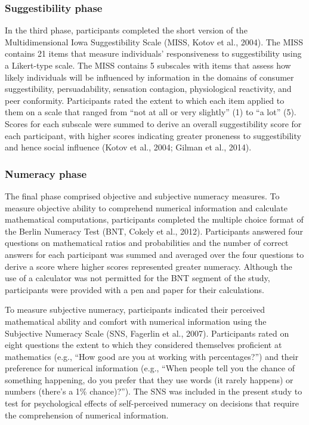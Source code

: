 \documentclass[
  pub,floatsintext]{apa6}
\begin{document}
\hypertarget{suggestibility-phase}{%
\subsubsection{Suggestibility phase}\label{suggestibility-phase}}

In the third phase, participants completed the short version of the Multidimensional Iowa Suggestibility Scale (MISS, Kotov et al., 2004). The MISS contains 21 items that measure individuals' responsiveness to suggestibility using a Likert-type scale. The MISS contains 5 subscales with items that assess how likely individuals will be influenced by information in the domains of consumer suggestibility, persuadability, sensation contagion, physiological reactivity, and peer conformity. Participants rated the extent to which each item applied to them on a scale that ranged from ``not at all or very slightly'' (1) to ``a lot'' (5). Scores for each subscale were summed to derive an overall suggestibility score for each participant, with higher scores indicating greater proneness to suggestibility and hence social influence (Kotov et al., 2004; Gilman et al., 2014).

\hypertarget{numeracy-phase}{%
\subsubsection{Numeracy phase}\label{numeracy-phase}}

The final phase comprised objective and subjective numeracy measures. To measure objective ability to comprehend numerical information and calculate mathematical computations, participants completed the multiple choice format of the Berlin Numeracy Test (BNT, Cokely et al., 2012). Participants answered four questions on mathematical ratios and probabilities and the number of correct answers for each participant was summed and averaged over the four questions to derive a score where higher scores represented greater numeracy. Although the use of a calculator was not permitted for the BNT segment of the study, participants were provided with a pen and paper for their calculations.

To measure subjective numeracy, participants indicated their perceived mathematical ability and comfort with numerical information using the Subjective Numeracy Scale (SNS, Fagerlin et al., 2007). Participants rated on eight questions the extent to which they considered themselves proficient at mathematics (e.g., ``How good are you at working with percentages?'') and their preference for numerical information (e.g., ``When people tell you the chance of something happening, do you prefer that they use words (it rarely happens) or numbers (there's a 1\% chance)?''). The SNS was included in the present study to test for psychological effects of self-perceived numeracy on decisions that require the comprehension of numerical information.
\end{document}
